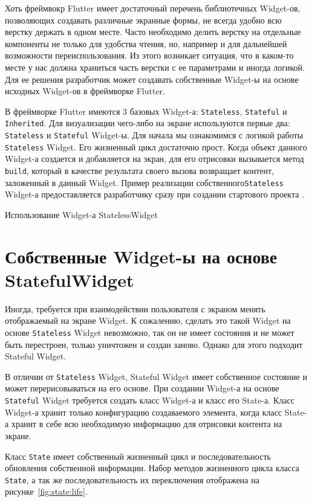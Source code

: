 Хоть фреймвокр Flutter имеет достаточный перечень библиотечных Widget-ов,
позволяющих создавать различные экранные формы,
не всегда удобно всю верстку держать в одном месте.
Часто необходимо делить верстку на отдельные компоненты не только
для удобства чтения, но,
например и для дальнейшей возможности переиспользования.
Из этого возникает ситуация,
что в каком-то месте у нас должна храниться часть верстки с ее параметрами
и иногда логикой.
Для ее решения разработчик может создавать собственные
Widget-ы на основе исходных Widget-ов в фреймворке Flutter.\par
В фреймворке Flutter имеются 3 базовых Widget-а:
\texttt{Stateless}, \texttt{Stateful} и \texttt{Inherited}.
Для визуализации чего-либо на экране используются первые два:
\texttt{Stateless} и \texttt{Stateful} Widget-ы.
Для начала мы ознакомимся с логикой работы \texttt{Stateless} Widget.
Его жизненный цикл достаточно прост.
Когда объект данного Widget-а создается и добавляется на экран,
для его отрисовки вызывается метод \texttt{build},
который в качестве результата своего вызова возвращает контент,
заложенный в данный Widget.
Пример реализации собственного\texttt{Stateless} Widget-а 
предоставляется разработчику сразу при создании стартового проекта
.

\begin{image}
	\caption{Использование Widget-а StatelessWidget}
	\label{fig:stateless}
\end{image}

\section{Собственные Widget-ы на основе StatefulWidget}

Иногда, требуется при взаимодействии пользователя
с экраном менять отображаемый на экране Widget.
К сожалению, сделать это такой Widget
на основе \texttt{Stateless} Widget невозможно,
так он не имеет состояния и не может быть перестроен,
только уничтожен и создан заново.
Однако для этого подходит Stateful Widget.\par
В отличии от \texttt{Stateless} Widget,
Stateful Widget имеет собственное состояние
и может перерисовываться на его основе.
При создании Widget-а на основе \texttt{Stateful} Widget
требуется создать класс Widget-а и класс его State-а.
Класс Widget-а хранит только конфигурацию создаваемого элемента,
когда класс State-а хранит в себе всю необходимую информацию
для отрисовки контента на экране.\par
Класс \texttt{State} имеет собственный жизненный цикл
и последовательность обновления собственной информации.
Набор методов жизненного цикла класса \texttt{State},
а так же последовательность их переключения отображена
на рисунке~\ref{fig:state:life}.

